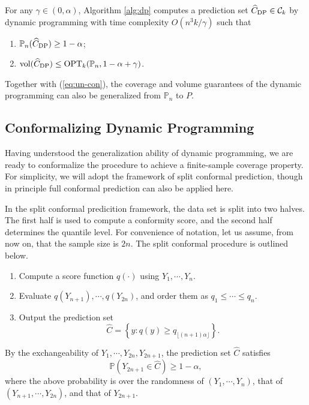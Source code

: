 

\begin{proposition}\label{thm:DP}
For any $\gamma\in(0,\alpha)$, Algorithm \ref{alg:dp} computes a prediction set $\widehat{C}_{\rm DP}\in \mathcal{C}_k$ by dynamic programming with time complexity $O(n^3k/\gamma)$ such that 
    \begin{enumerate}
        \item $\mathbb{P}_n(\widehat{C}_{\rm DP})\geq 1-\alpha$;
        \item $\mathrm{vol}(\widehat{C}_{\rm DP})\leq \operatorname{OPT}_k(\mathbb{P}_n,1-\alpha+\gamma)$.
    \end{enumerate}
\end{proposition}

Together with (\ref{eq:un-con}), the coverage and volume guarantees of the dynamic programming can also be generalized from $\mathbb{P}_n$ to $P$.

\subsection{Conformalizing Dynamic Programming}\label{sec:cdp}

Having understood the generalization ability of dynamic programming, we are ready to conformalize the procedure to achieve a finite-sample coverage property. For simplicity, we will adopt the framework of split conformal prediction, though in principle full conformal prediction can also be applied here.

In the split conformal predicition framework, the data set is split into two halves. The first half is used to compute a conformity score, and the second half determines the quantile level. For convenience of notation, let us assume, from now on, that the sample size is $2n$. The split conformal procedure is outlined below.
\begin{enumerate}
\item Compute a score function $q(\cdot)$ using $Y_1,\cdots,Y_n$.
\item Evaluate $q(Y_{n+1}),\cdots, q(Y_{2n})$, and order them as $q_1\leq \cdots\leq q_n$.
\item Output the prediction set
\begin{equation}
\widehat{C}=\left\{y: q(y)\geq q_{\lfloor(n+1)\alpha\rfloor}\right\}. \label{eq:pred-set-un}
\end{equation}
\end{enumerate}
By the exchangeability of $Y_1,\cdots,Y_{2n},Y_{2n+1}$, the prediction set $\widehat{C}$ satisfies
$$\mathbb{P}\left(Y_{2n+1}\in \widehat{C}\right)\geq 1-\alpha,$$
where the above probability is over the randomness of $(Y_1,\cdots,Y_n)$, that of $(Y_{n+1},\cdots,Y_{2n})$, and that of $Y_{2n+1}$.

